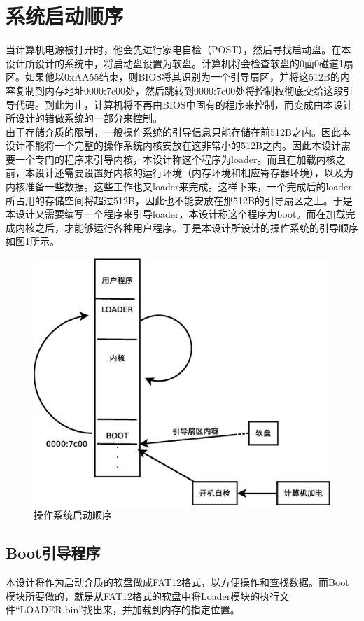 \documentclass[UTF8,nofonts,cs4size]{ctexrep}
\begin{document}
\section{系统启动顺序}
当计算机电源被打开时，他会先进行家电自检（POST），然后寻找启动盘。在本设计所设计的系统中，将启动盘设置为软盘。计算机将会检查软盘的0面0磁道1扇区。如果他以0xAA55结束，则BIOS将其识别为一个引导扇区，并将这512B的内容复制到内存地址0000:7c00处，然后跳转到0000:7c00处将控制权彻底交给这段引导代码。到此为止，计算机将不再由BIOS中固有的程序来控制，而变成由本设计所设计的错做系统的一部分来控制。
\\
\indent  
由于存储介质的限制，一般操作系统的引导信息只能存储在前512B之内。因此本设计不能将一个完整的操作系统内核安放在这非常小的512B之内。因此本设计需要一个专门的程序来引导内核，本设计称这个程序为loader。而且在加载内核之前，本设计还需要设置好内核的运行环境（内存环境和相应寄存器环境），以及为内核准备一些数据。这些工作也又loader来完成。这样下来，一个完成后的loader所占用的存储空间将超过512B，因此也不能安放在那512B的引导扇区之上。于是本设计又需要编写一个程序来引导loader，本设计称这个程序为boot。而在加载完成内核之后，才能够运行各种用户程序。于是本设计所设计的操作系统的引导顺序如图\ref{start}所示。

\begin{figure}[htp]
\centering
\includegraphics[scale=0.38]{start.eps}
\caption{操作系统启动顺序}
\label{start}
\end{figure}

\subsection{Boot引导程序}
本设计将作为启动介质的软盘做成FAT12格式，以方便操作和查找数据。而Boot模块所要做的，就是从FAT12格式的软盘中将Loader模块的执行文件“LOADER.bin”找出来，并加载到内存的指定位置。
\end{document}
